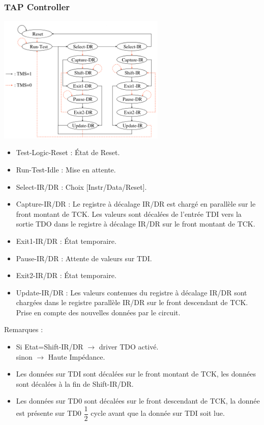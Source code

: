 \documentclass[10pt]{article}
\begin{document}
\begin{multicols}{2}
  \subsubsection{TAP Controller}
  \includegraphics[width=8cm]{tap.png}
  \begin{itemize}
    \itemsep0em
    \item Test-Logic-Reset : État de Reset.
    \item Run-Test-Idle : Mise en attente.
    \item Select-IR/DR : Choix [Instr/Data/Reset].
    \item Capture-IR/DR : Le registre à décalage IR/DR est chargé en parallèle
    sur le front montant de TCK. Les valeurs sont décalées de l'entrée TDI vers
    la sortie TDO dans le registre à décalage IR/DR sur le front montant de TCK.
    \item Exit1-IR/DR : État temporaire.
    \item Pause-IR/DR : Attente de valeurs sur TDI.
    \item Exit2-IR/DR : État temporaire.
    \item Update-IR/DR : Les valeurs contenues du registre à décalage IR/DR sont
    chargées dans le registre parallèle IR/DR sur le front descendant de TCK.\\
    Prise en compte des nouvelles données par le circuit.
  \end{itemize}
  Remarques :
  \begin{itemize}
    \itemsep0em
    \item Si Etat=Shift-IR/DR $\rightarrow$ driver TDO activé.\\
          sinon $\rightarrow$ Haute Impédance.
    \item Les données sur TDI sont décalées sur le front montant de TCK, les
    données sont décalées à la fin de Shift-IR/DR.
    \item Les données sur TD0 sont décalées sur le front descendant de TCK, la
    donnée est présente sur TD0 $\dfrac{1}{2}$ cycle avant que la donnée sur TDI
    soit lue.
  \end{itemize}

\end{multicols}
\end{document}
